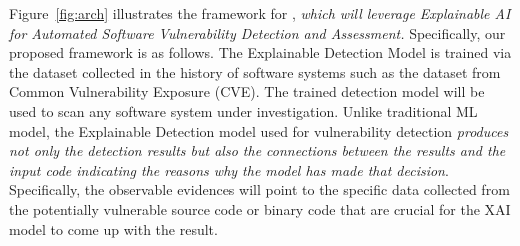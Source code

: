 Figure~\ref{fig:arch} illustrates the framework for {\tool},
          {\em which will leverage Explainable AI for Automated
            Software Vulnerability Detection and Assessment.}
Specifically, our proposed framework is as follows. The Explainable
Detection Model is trained via the dataset collected in the history of
software systems such as the dataset from Common Vulnerability
Exposure (CVE). The trained detection model will be used to scan any
software system under investigation.
Unlike traditional ML model, the Explainable Detection model used for
vulnerability detection {\em produces not only the detection results
  but also the connections between the results and the input code
  indicating the reasons why the model has made that decision}.
Specifically, the observable evidences will point to the specific data
collected from the potentially vulnerable source code or binary code
that are crucial for the XAI model to come up with the result.
